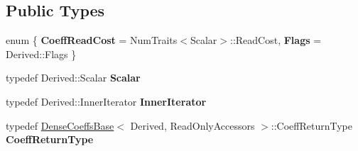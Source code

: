 \subsection*{Public Types}
\begin{DoxyCompactItemize}
\item 
\mbox{\label{struct_eigen_1_1internal_1_1evaluator_3_01_sparse_compressed_base_3_01_derived_01_4_01_4_a86b15018ee31abdc5ce64dfd15c4c31d}} 
enum \{ {\bfseries Coeff\+Read\+Cost} = Num\+Traits$<$Scalar$>$\+::Read\+Cost, 
{\bfseries Flags} = Derived\+::Flags
 \}
\item 
\mbox{\label{struct_eigen_1_1internal_1_1evaluator_3_01_sparse_compressed_base_3_01_derived_01_4_01_4_a0ee9c4e4302545da033cb6574a92b0c5}} 
typedef Derived\+::\+Scalar {\bfseries Scalar}
\item 
\mbox{\label{struct_eigen_1_1internal_1_1evaluator_3_01_sparse_compressed_base_3_01_derived_01_4_01_4_abc5d24ea2cacb1f9fa79e7e936e70816}} 
typedef Derived\+::\+Inner\+Iterator {\bfseries Inner\+Iterator}
\item 
\mbox{\label{struct_eigen_1_1internal_1_1evaluator_3_01_sparse_compressed_base_3_01_derived_01_4_01_4_a6a09f2251fbe97b764aedfe9a05a19d7}} 
typedef \mbox{\hyperlink{class_eigen_1_1_dense_coeffs_base}{Dense\+Coeffs\+Base}}$<$ Derived, Read\+Only\+Accessors $>$\+::Coeff\+Return\+Type {\bfseries Coeff\+Return\+Type}
\end{DoxyCompactItemize}
